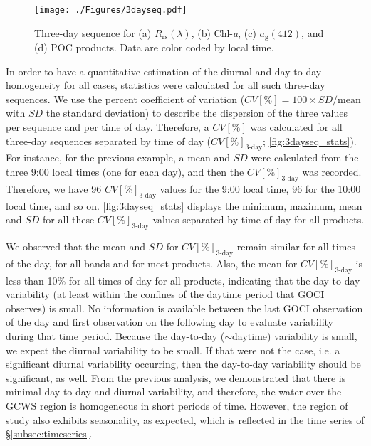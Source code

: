 \documentclass[remotesensing,article,submit,moreauthors,pdftex,10pt,a4paper]{Definitions/mdpi}
\begin{document}
\begin{figure}[htbp!]

\centering
\hspace{-0.8cm}
\texttt{[image: ./Figures/3dayseq.pdf]}
\caption{Three-day sequence for (a) $R_\text{rs}(\lambda)$, (b) Chl-{\it a}, (c) $a_\text{g}(412)$, and (d) POC products. Data are color coded by local time.\label{fig:3dayseq} }     

\end{figure}
In order to have a quantitative estimation of the diurnal and day-to-day homogeneity for all cases, statistics were calculated for all such three-day sequences. We use the percent coefficient of variation ($CV[\%] = 100 \times SD/\text{mean}$ with $SD$ the standard deviation) to describe the dispersion of the three values per sequence and per time of day. Therefore, a $CV[\%]$ was calculated for all three-day sequences separated by time of day ($CV[\%]_\text{3-day}$; \autoref{fig:3dayseq_stats}). For instance, for the previous example, a mean and $SD$ were calculated from the three 9:00 local times (one for each day), and then the $CV[\%]_\text{3-day}$ was recorded. Therefore, we have 96 $CV[\%]_\text{3-day}$ values for the 9:00 local time, 96 for the 10:00 local time, and so on. \autoref{fig:3dayseq_stats} displays the minimum, maximum, mean and $SD$ for all these $CV[\%]_\text{3-day}$ values separated by time of day for all products. 

We observed that the mean and $SD$ for $CV[\%]_\text{3-day}$ remain similar for all times of the day, for all bands and for most products. Also, the mean for $CV[\%]_\text{3-day}$ is less than 10\% for all times of day for all products, indicating that the day-to-day variability (at least within the confines of the daytime period that GOCI observes) is small. No information is available between the last GOCI observation of the day and first observation on the following day to evaluate variability during that time period.  Because the day-to-day ($\sim$daytime) variability is small, we expect the diurnal variability to be small. If that were not the case, i.e. a significant diurnal variability occurring, then the day-to-day variability should be significant, as well. From the previous analysis, we demonstrated that there is minimal day-to-day and diurnal variability, and therefore, the water over the GCWS region is homogeneous in short periods of time. However, the region of study also exhibits seasonality, as expected, which is reflected in the time series of \S\ref{subsec:timeseries}. 
\end{document}
